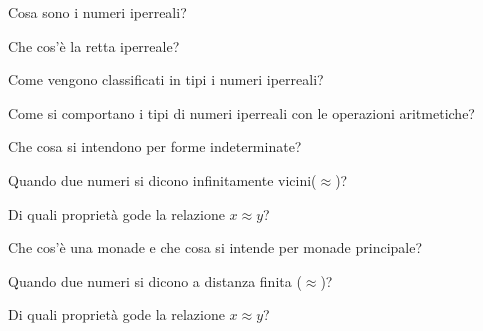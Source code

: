 \begin{multicols}{2}
\begin{esercizio}\label{ese:iper_013}
Cosa sono i numeri iperreali?
\end{esercizio}

\begin{esercizio}\label{ese:iper_014}
Che cos'è la retta iperreale?
\end{esercizio}

\begin{esercizio}\label{ese:iper_015}
Come vengono classificati in tipi i numeri iperreali?
\end{esercizio}

\begin{esercizio}\label{ese:iper_016}
Come si comportano i tipi di numeri iperreali con le operazioni aritmetiche?
\begin{description} [nosep]
 \item [Addizione/sottrazione:]
 \item [Moltiplicazione:]
 \item [Reciproco:]
 \item [Divisione:]
\end{description}
\end{esercizio}

\begin{esercizio}\label{ese:iper_017}
Che cosa si intendono per forme indeterminate?
\end{esercizio}

\begin{esercizio}\label{ese:iper_018}
Quando due numeri si dicono infinitamente vicini(\(\approx\))?
\end{esercizio}

\begin{esercizio}\label{ese:iper_019}
Di quali proprietà gode la relazione \(x \approx y\)?
\end{esercizio}

\begin{esercizio}\label{ese:iper_020}
Che cos'è una monade e che cosa si intende per monade principale?
\end{esercizio}

\begin{esercizio}\label{ese:iper_021}
Quando due numeri si dicono a distanza finita (\(\approx\))?
\end{esercizio}

\begin{esercizio}\label{ese:iper_022}
Di quali proprietà gode la relazione \(x \approx y\)?
\end{esercizio}


\end{multicols}
